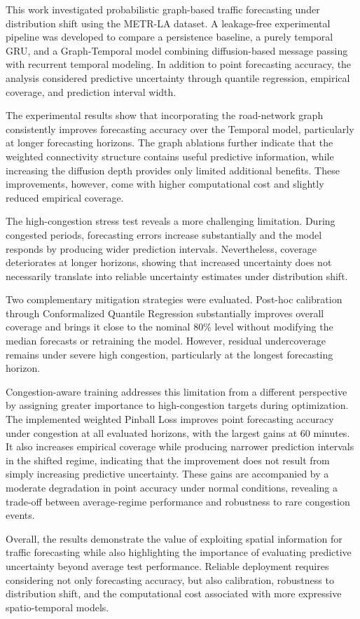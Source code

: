 This work investigated probabilistic graph-based traffic forecasting under
distribution shift using the METR-LA dataset. A leakage-free experimental
pipeline was developed to compare a persistence baseline, a purely temporal
GRU, and a Graph-Temporal model combining diffusion-based message passing with
recurrent temporal modeling. In addition to point forecasting accuracy, the
analysis considered predictive uncertainty through quantile regression,
empirical coverage, and prediction interval width.

The experimental results show that incorporating the road-network graph
consistently improves forecasting accuracy over the Temporal model,
particularly at longer forecasting horizons. The graph ablations further
indicate that the weighted connectivity structure contains useful predictive
information, while increasing the diffusion depth provides only limited
additional benefits. These improvements, however, come with higher
computational cost and slightly reduced empirical coverage.

The high-congestion stress test reveals a more challenging limitation.
During congested periods, forecasting errors increase substantially and the
model responds by producing wider prediction intervals. Nevertheless,
coverage deteriorates at longer horizons, showing that increased uncertainty
does not necessarily translate into reliable uncertainty estimates under
distribution shift.

Two complementary mitigation strategies were evaluated. Post-hoc calibration
through Conformalized Quantile Regression substantially improves overall
coverage and brings it close to the nominal 80\% level without modifying the
median forecasts or retraining the model. However, residual undercoverage
remains under severe high congestion, particularly at the longest forecasting
horizon.

Congestion-aware training addresses this limitation from a different
perspective by assigning greater importance to high-congestion targets during
optimization. The implemented weighted Pinball Loss improves point forecasting
accuracy under congestion at all evaluated horizons, with the largest gains
at 60 minutes. It also increases empirical coverage while producing narrower
prediction intervals in the shifted regime, indicating that the improvement
does not result from simply increasing predictive uncertainty. These gains
are accompanied by a moderate degradation in point accuracy under normal
conditions, revealing a trade-off between average-regime performance and
robustness to rare congestion events.

Overall, the results demonstrate the value of exploiting spatial information
for traffic forecasting while also highlighting the importance of evaluating
predictive uncertainty beyond average test performance. Reliable deployment
requires considering not only forecasting accuracy, but also calibration,
robustness to distribution shift, and the computational cost associated with
more expressive spatio-temporal models.